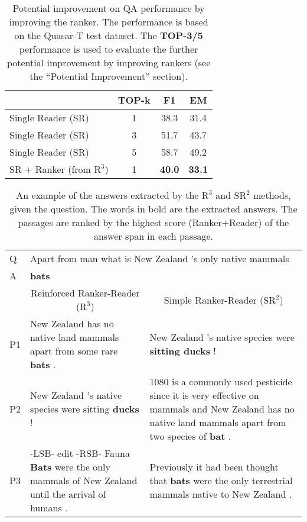 \documentclass[letterpaper]{article} %
\begin{document}
\begin{table}[h]
\centering
\begin{tabular}{lccc}
\toprule
                 & TOP-k & F1            & EM \\
                  \midrule
Single Reader (SR) & 1 & 38.3 & 31.4 \\
Single Reader (SR) & 3 & 51.7 & 43.7 \\
Single Reader (SR) & 5 & 58.7 & 49.2 \\
SR + Ranker (from $\text{R}^3$) & 1  & \textbf{40.0} & \textbf{33.1} \\
\bottomrule
                  \end{tabular}
\caption{Potential improvement on QA performance by improving the ranker. The performance is based on the Quasar-T test dataset.  
The \textbf{TOP-3/5} performance is used to evaluate the further potential improvement by improving rankers (see the ``Potential Improvement'' section).
}
\label{tab:analysis_upper}

\end{table}




\begin{table*}[]
\centering
\small
\begin{tabular}{lll}
\toprule
Q & \multicolumn{2}{l}{Apart from man what is New Zealand 's only native mammals}  \\
A  & \multicolumn{2}{l}{\textbf{bats}} \\
\midrule
         & \multicolumn{1}{c}{Reinforced Ranker-Reader ($\text{R}^3$)}                           & \multicolumn{1}{c}{Simple Ranker-Reader ($\text{SR}^2$)}                                                                                         \\
P1 & \multicolumn{1}{p{8cm}}{New Zealand has no native land mammals apart from some rare \textbf{bats} . %
} &\multicolumn{1}{p{8cm}}{ New Zealand 's native species were \textbf{sitting ducks} ! %
} \\
P2 & \multicolumn{1}{p{8cm}}{New Zealand 's native species were sitting \textbf{ducks} !   %
}  & 
\multicolumn{1}{p{8cm}}{1080 is a commonly used pesticide since it is very effective on mammals and New Zealand has no native land mammals apart from two species of \textbf{bat} .                          %
} \\
P3 & \multicolumn{1}{p{8cm}}{-LSB- edit -RSB- Fauna \textbf{Bats} were the only mammals of New Zealand until the arrival of humans . %
} & \multicolumn{1}{p{8cm}}{Previously it had been thought that \textbf{bats} were the only terrestrial mammals native to New Zealand .                             %
}
\\ \bottomrule
\end{tabular}
\normalsize
\caption{An example of the answers extracted by the $\text{R}^3$ and $\text{SR}^2$ methods, given the question. The words in bold are the extracted answers. The passages are ranked by the highest score (Ranker+Reader) of the answer span in each passage. 
}
\label{tab:analysis2}
\end{table*}
\end{document}
